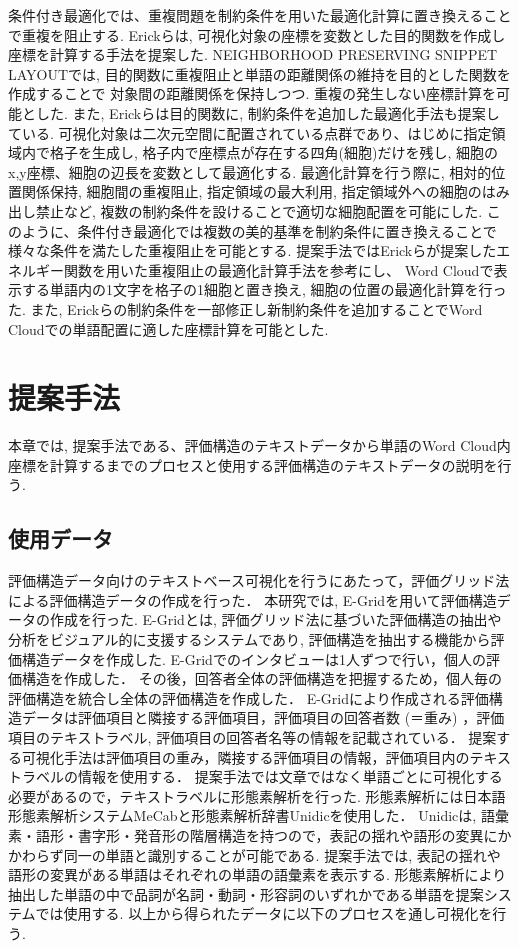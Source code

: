 \documentclass[syuuron]{kuee}
\begin{document}
		条件付き最適化では、重複問題を制約条件を用いた最適化計算に置き換えることで重複を阻止する. 
		Erickらは, 可視化対象の座標を変数とした目的関数を作成し座標を計算する手法を提案した\cite{or1}. 
		NEIGHBORHOOD PRESERVING SNIPPET LAYOUTでは, 目的関数に重複阻止と単語の距離関係の維持を目的とした関数を作成することで
		対象間の距離関係を保持しつつ. 重複の発生しない座標計算を可能とした. 
		また, Erickらは目的関数に, 制約条件を追加した最適化手法も提案している\cite{or2}.  
		可視化対象は二次元空間に配置されている点群であり、はじめに指定領域内で格子を生成し, 格子内で座標点が存在する四角(細胞)だけを残し, 
		細胞のx,y座標、細胞の辺長を変数として最適化する. 
		最適化計算を行う際に, 相対的位置関係保持, 細胞間の重複阻止, 指定領域の最大利用, 指定領域外への細胞のはみ出し禁止など, 
		複数の制約条件を設けることで適切な細胞配置を可能にした. 
		このように、条件付き最適化では複数の美的基準を制約条件に置き換えることで様々な条件を満たした重複阻止を可能とする. 
		提案手法ではErickらが提案したエネルギー関数を用いた重複阻止の最適化計算手法を参考にし、
		Word Cloudで表示する単語内の1文字を格子の1細胞と置き換え, 細胞の位置の最適化計算を行った. 
		また, Erickらの制約条件を一部修正し新制約条件を追加することでWord Cloudでの単語配置に適した座標計算を可能とした. 

\chapter{提案手法}
	本章では, 提案手法である、評価構造のテキストデータから単語のWord Cloud内座標を計算するまでのプロセスと使用する評価構造のテキストデータの説明を行う. 
	
	\section{使用データ}
		評価構造データ向けのテキストベース可視化を行うにあたって，評価グリッド法による評価構造データの作成を行った．
		本研究では, E-Gridを用いて評価構造データの作成を行った. 
		E-Gridとは, 評価グリッド法に基づいた評価構造の抽出や分析をビジュアル的に支援するシステムであり, 
		評価構造を抽出する機能から評価構造データを作成した. 
		E-Gridでのインタビューは1人ずつで行い，個人の評価構造を作成した．
		その後，回答者全体の評価構造を把握するため，個人毎の評価構造を統合し全体の評価構造を作成した．
		E-Gridにより作成される評価構造データは評価項目と隣接する評価項目，評価項目の回答者数 (＝重み) ，評価項目のテキストラベル, 評価項目の回答者名等の情報を記載されている．
		提案する可視化手法は評価項目の重み，隣接する評価項目の情報，評価項目内のテキストラベルの情報を使用する．
		提案手法では文章ではなく単語ごとに可視化する必要があるので，テキストラベルに形態素解析を行った. 
		形態素解析には日本語形態素解析システムMeCab\cite{mcb1}と形態素解析辞書Unidicを使用した．
		Unidicは, 語彙素・語形・書字形・発音形の階層構造を持つので，表記の揺れや語形の変異にかかわらず同一の単語と識別することが可能である. 
		提案手法では, 表記の揺れや語形の変異がある単語はそれぞれの単語の語彙素を表示する. 
		形態素解析により抽出した単語の中で品詞が名詞・動詞・形容詞のいずれかである単語を提案システムでは使用する. 
		以上から得られたデータに以下のプロセスを通し可視化を行う. 
		
\end{document}
